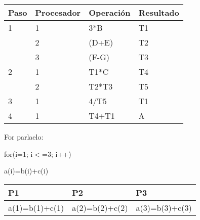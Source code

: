 {\raggedright

\vspace{3pt} \noindent
\begin{tabular}{|p{91pt}|p{90pt}|p{90pt}|p{90pt}|}
\hline
\parbox{91pt}{\raggedright 
\textbf{Paso}
} & \parbox{90pt}{\raggedright 
\textbf{Procesador}
} & \parbox{90pt}{\raggedright 
\textbf{Operación}
} & \parbox{90pt}{\raggedright 
\textbf{Resultado}
} \\
\hline
\parbox{91pt}{\raggedright 
1
} & \parbox{90pt}{\raggedright 
1
} & \parbox{90pt}{\raggedright 
3*B
} & \parbox{90pt}{\raggedright 
T1
} \\
\hline
\parbox{91pt}{\raggedright 

} & \parbox{90pt}{\raggedright 
2
} & \parbox{90pt}{\raggedright 
(D+E)
} & \parbox{90pt}{\raggedright 
T2
} \\
\hline
\parbox{91pt}{\raggedright 

} & \parbox{90pt}{\raggedright 
3
} & \parbox{90pt}{\raggedright 
(F-G)
} & \parbox{90pt}{\raggedright 
T3
} \\
\hline
\parbox{91pt}{\raggedright 
2
} & \parbox{90pt}{\raggedright 
1
} & \parbox{90pt}{\raggedright 
T1*C
} & \parbox{90pt}{\raggedright 
T4
} \\
\hline
\parbox{91pt}{\raggedright 

} & \parbox{90pt}{\raggedright 
2
} & \parbox{90pt}{\raggedright 
T2*T3
} & \parbox{90pt}{\raggedright 
T5
} \\
\hline
\parbox{91pt}{\raggedright 
3
} & \parbox{90pt}{\raggedright 
1
} & \parbox{90pt}{\raggedright 
4/T5
} & \parbox{90pt}{\raggedright 
T1
} \\
\hline
\parbox{91pt}{\raggedright 
4
} & \parbox{90pt}{\raggedright 
1
} & \parbox{90pt}{\raggedright 
T4+T1
} & \parbox{90pt}{\raggedright 
A
} \\
\hline
\end{tabular}
\vspace{2pt}
}
\vspace{2cm}

For parlaelo:

for(i=1; i$<$=3; i++)

a(i)=b(i)+c(i)

\vspace{2cm}
{\raggedright

\vspace{3pt} \noindent
\begin{tabular}{|p{127pt}|p{134pt}|p{111pt}|}
\hline
\parbox{127pt}{\raggedright 
\textbf{P1}
} & \parbox{134pt}{\raggedright 
\textbf{P2}
} & \parbox{111pt}{\raggedright 
\textbf{P3}
} \\
\hline
\parbox{127pt}{\raggedright 
a(1)=b(1)+c(1)
} & \parbox{134pt}{\raggedright 
a(2)=b(2)+c(2)
} & \parbox{111pt}{\raggedright 
a(3)=b(3)+c(3)
} \\
\hline
\end{tabular}
\vspace{2pt}

}
\vspace{2cm}

